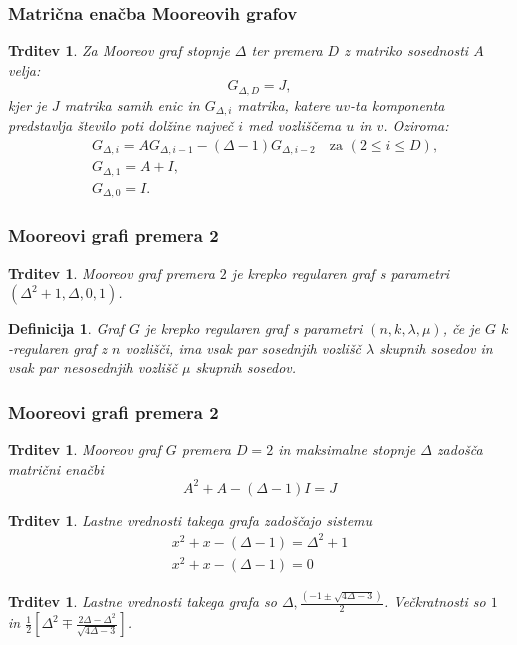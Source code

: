 \documentclass{beamer}
\newtheorem{trditev}[izrek]{Trditev}
\newtheorem{definicija}[izrek]{Definicija}
\begin{document}
\begin{frame}
    \frametitle{Matrična enačba Mooreovih grafov}
    \begin{trditev}
    Za Mooreov graf stopnje $\Delta$ ter premera $D$ z matriko
    sosednosti $A$ velja:
\[G_{\Delta, D} = J,\]    
kjer je $J$ matrika samih enic in $G_{\Delta, i}$ matrika, 
katere $uv$-ta komponenta predstavlja število poti dolžine 
največ $i$ med vozliščema $u$ in $v$. Oziroma:
\begin{align*}
    &G_{\Delta, i} = A G_{\Delta, i-1} -
(\Delta - 1) G_{\Delta, i-2} \quad \text{za } (2 \le i \le D),\\
&G_{\Delta, 1} = A + I,\\
&G_{\Delta, 0} = I.
\end{align*}
    \end{trditev}
\end{frame}

\begin{frame}
    \frametitle{Mooreovi grafi premera 2}
    \begin{trditev}
        Mooreov graf premera $2$ je krepko regularen graf s parametri 
        $(\Delta^2 + 1, \Delta, 0, 1)$.
    \end{trditev}
    \begin{definicija}
        Graf $G$ je krepko regularen graf s parametri $(n, k, \lambda, \mu)$, 
        če je $G$ $k$-regularen graf z $n$ vozlišči, 
        ima vsak par sosednjih vozlišč $\lambda$ skupnih sosedov in
        vsak par nesosednjih vozlišč $\mu$ skupnih sosedov.
    \end{definicija}
\end{frame}

\begin{frame}
\frametitle{Mooreovi grafi premera 2}
\begin{trditev}
    Mooreov graf $G$ premera $D=2$ in maksimalne stopnje $\Delta$ zadošča matrični enačbi
    \[A^2 + A - (\Delta - 1) I = J\]
\end{trditev}
\begin{trditev}
    Lastne vrednosti takega grafa zadoščajo sistemu
    \begin{align*}
        x^2 + x - (\Delta - 1) = \Delta^2 + 1 \\
        x^2 + x - (\Delta - 1) = 0
    \end{align*}
\end{trditev}
\begin{trditev}
    Lastne vrednosti takega grafa so 
    $\Delta, \frac{(-1 \pm \sqrt{4\Delta - 3})}{2}$.
    Večkratnosti so $1$ in $\frac{1}{2}[\Delta^2 \mp \frac{2\Delta - \Delta^2}{\sqrt{4\Delta - 3}}]$.
\end{trditev}
\end{frame}
\end{document}
